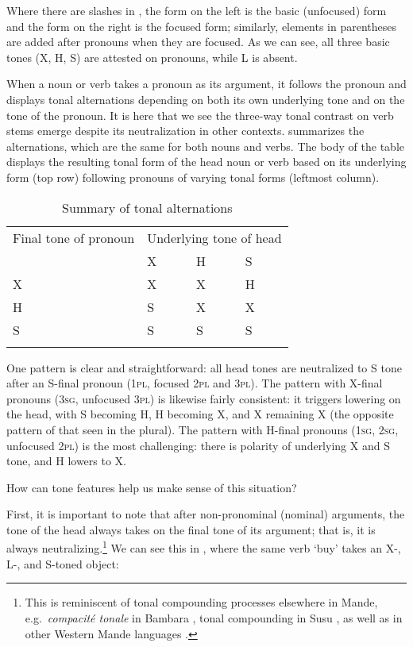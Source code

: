 \documentclass[output=paper]{langsci/langscibook}
\begin{document}
Where there are slashes in , the form on the left is the basic (unfocused) form and the form on the right is the focused form; similarly, elements in parentheses are added after pronouns when they are focused. As we can see, all three basic tones (X, H, S) are attested on pronouns, while L is absent.

When a noun or verb takes a pronoun as its argument, it follows the pronoun and displays tonal alternations depending on both its own underlying tone and on the tone of the pronoun. It is here that we see the three-way tonal contrast on verb stems emerge despite its neutralization in other contexts.  summarizes the alternations, which are the same for both nouns and verbs. The body of the table displays the resulting tonal form of the head noun or verb based on its underlying form (top row) following pronouns of varying tonal forms (leftmost column).

\begin{table}
\begin{tabularx}{\textwidth}{XXXX} 
\lsptoprule
Final tone of pronoun & \multicolumn{3}{c}{Underlying tone of head} \\\cmidrule(lr){2-4}
 & X & H & S \\ \midrule
X & X & X & H \\
H & S & X & X \\
S & S & S & S \\
\lspbottomrule
\end{tabularx}
\caption{Summary of tonal alternations}
\label{tab:mcpherson:3}
\end{table}

One pattern is clear and straightforward: all head tones are neutralized to S tone after an S-final pronoun (1\textsc{pl}, focused 2\textsc{pl} and 3\textsc{pl}). The pattern with X-final pronouns (3\textsc{sg}, unfocused 3\textsc{pl}) is likewise fairly consistent: it triggers lowering on the head, with S becoming H, H becoming X, and X remaining X (the opposite pattern of that seen in the plural). The pattern with H-final pronouns (1\textsc{sg}, 2\textsc{sg}, unfocused 2\textsc{pl}) is the most challenging: there is polarity of underlying X and S tone, and H lowers to X. 

How can tone features help us make sense of this situation?

First, it is important to note that after non-pronominal (nominal) arguments, the tone of the head always takes on the final tone of its argument; that is, it is always neutralizing.\footnote{This is reminiscent of tonal compounding processes elsewhere in Mande, e.g.\ {\it compacit\'e tonale} in Bambara \citep{Creissels78,Creissels88,Creissels92,Dumestre84,Green10}, tonal compounding in Susu \citep{Gregoire78,Greenetal13}, as well as in other Western Mande languages \citep{deZeeuw79}.} We can see this in , where the same verb {\it {}} `buy' takes an X-, L-, and S-toned object:
\end{document}
